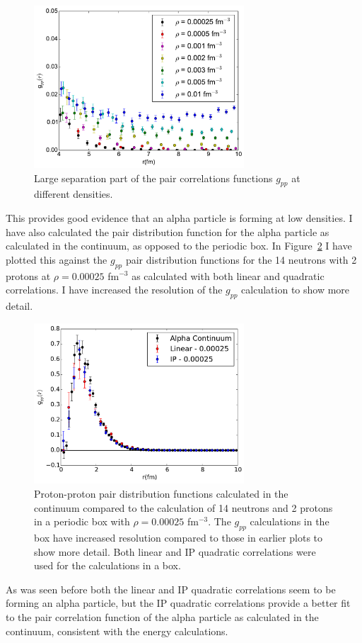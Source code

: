 \begin{figure}[h!]
   \centering
   \includegraphics[width=0.7\textwidth]{figures/gpp_small.pdf}
   \caption{Large separation part of the pair correlations functions $g_{pp}$ at different densities.}
   \label{fig:gpp_small}
\end{figure}

This provides good evidence that an alpha particle is forming at low densities. I have also calculated the pair distribution function for the alpha particle as calculated in the continuum, as opposed to the periodic box. In Figure~\ref{fig:gpp_compare} I have plotted this against the $g_{pp}$ pair distribution functions for the 14 neutrons with 2 protons at $\rho=0.00025$ fm$^{-3}$ as calculated with both linear and quadratic correlations. I have increased the resolution of the $g_{pp}$ calculation to show more detail.
\begin{figure}[h!]
   \centering
   \includegraphics[width=0.7\textwidth]{figures/gpp_compare.pdf}
   \caption{Proton-proton pair distribution functions calculated in the continuum compared to the calculation of 14 neutrons and 2 protons in a periodic box with $\rho=0.00025$ fm$^{-3}$. The $g_{pp}$ calculations in the box have increased resolution compared to those in earlier plots to show more detail. Both linear and IP quadratic correlations were used for the calculations in a box.}
   \label{fig:gpp_compare}
\end{figure}
As was seen before both the linear and IP quadratic correlations seem to be forming an alpha particle, but the IP quadratic correlations provide a better fit to the pair correlation function of the alpha particle as calculated in the continuum, consistent with the energy calculations.

